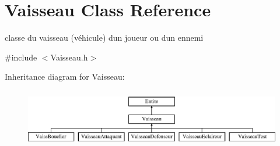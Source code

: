 \hypertarget{class_vaisseau}{}\section{Vaisseau Class Reference}
\label{class_vaisseau}


classe du vaisseau (véhicule) d\textquotesingle{}un joueur ou d\textquotesingle{}un ennemi  




{\ttfamily \#include $<$Vaisseau.\+h$>$}

Inheritance diagram for Vaisseau\+:\begin{figure}[H]
\begin{center}
\leavevmode
\includegraphics[height=2.564885cm]{class_vaisseau}
\end{center}
\end{figure}
